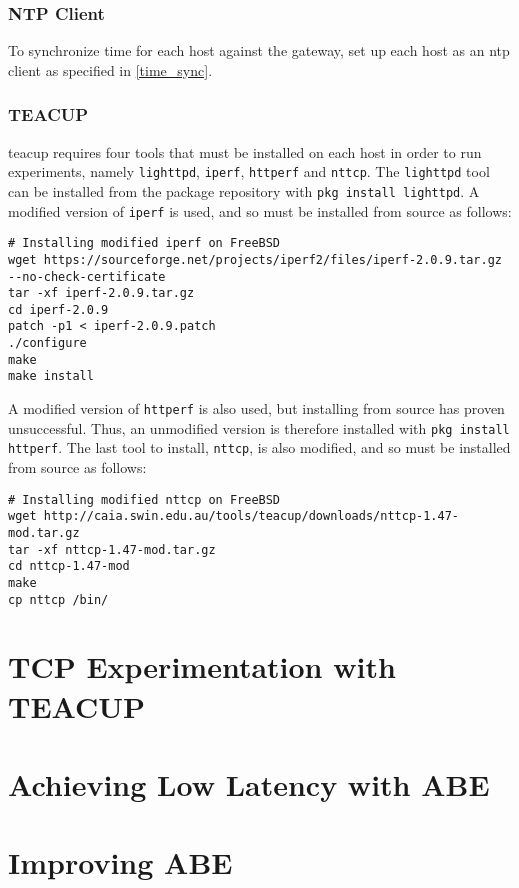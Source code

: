 \subsubsection{NTP Client}

To synchronize time for each host against the gateway, set up each host as an \gls{ntp} client as specified in \ref{time_sync}.


\subsubsection{TEACUP}

\gls{teacup} requires four tools that must be installed on each host in order to run experiments, namely \lstinline{lighttpd},  \lstinline{iperf}, \lstinline{httperf} and \lstinline{nttcp}. The \lstinline{lighttpd} tool can be installed from the package repository with \lstinline{pkg install lighttpd}. A modified version of \lstinline{iperf} is used, and so must be installed from source as follows:

\begin{verbatim}
# Installing modified iperf on FreeBSD
wget https://sourceforge.net/projects/iperf2/files/iperf-2.0.9.tar.gz --no-check-certificate
tar -xf iperf-2.0.9.tar.gz
cd iperf-2.0.9
patch -p1 < iperf-2.0.9.patch
./configure
make
make install
\end{verbatim}


A modified version of \lstinline{httperf} is also used, but installing from source has proven unsuccessful. Thus, an unmodified version is therefore installed with \lstinline{pkg install httperf}. The last tool to install, \lstinline{nttcp}, is also modified, and so must be installed from source as follows:

\begin{verbatim}
# Installing modified nttcp on FreeBSD
wget http://caia.swin.edu.au/tools/teacup/downloads/nttcp-1.47-mod.tar.gz
tar -xf nttcp-1.47-mod.tar.gz
cd nttcp-1.47-mod
make
cp nttcp /bin/
\end{verbatim}


























\section{TCP Experimentation with TEACUP}




\section{Achieving Low Latency with ABE}



\section{Improving ABE}